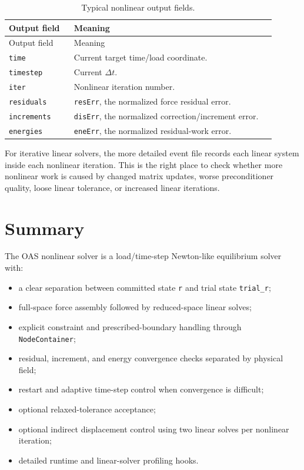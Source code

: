 \documentclass[11pt,a4paper]{article}
\newcommand{\code}[1]{\ifmmode\text{\texttt{\detokenize{#1}}}\else\nolinkurl{#1}\fi}
\newcommand{\oas}{\textsc{OAS}}
\begin{document}
\begin{longtable}{p{0.22\linewidth} p{0.68\linewidth}}
\caption{Typical nonlinear output fields.}
\label{tab:output-fields}\\
\toprule
Output field & Meaning \\
\midrule
\endfirsthead
\toprule
Output field & Meaning \\
\midrule
\endhead
\code{time} &
Current target time/load coordinate. \\

\code{timestep} &
Current \(\Delta t\). \\

\code{iter} &
Nonlinear iteration number. \\

\code{residuals} &
\code{resErr}, the normalized force residual error. \\

\code{increments} &
\code{disErr}, the normalized correction/increment error. \\

\code{energies} &
\code{eneErr}, the normalized residual-work error. \\
\bottomrule
\end{longtable}

For iterative linear solvers, the more detailed event file records each linear
system inside each nonlinear iteration.  This is the right place to check
whether more nonlinear work is caused by changed matrix updates, worse
preconditioner quality, loose linear tolerance, or increased linear iterations.

\section{Summary}

The \oas{} nonlinear solver is a load/time-step Newton-like equilibrium solver
with:

\begin{itemize}[leftmargin=2em]
  \item a clear separation between committed state \code{r} and trial state
        \code{trial_r};
  \item full-space force assembly followed by reduced-space linear solves;
  \item explicit constraint and prescribed-boundary handling through
        \code{NodeContainer};
  \item residual, increment, and energy convergence checks separated by
        physical field;
  \item restart and adaptive time-step control when convergence is difficult;
  \item optional relaxed-tolerance acceptance;
  \item optional indirect displacement control using two linear solves per
        nonlinear iteration;
  \item detailed runtime and linear-solver profiling hooks.
\end{itemize}
\end{document}
